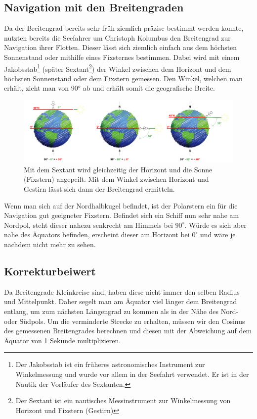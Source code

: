 \begin{refsection}
\subsection{Navigation mit den Breitengraden}  \label{BreitengradM}
Da der Breitengrad bereits sehr früh ziemlich präzise bestimmt werden konnte, nutzten bereits die Seefahrer um Christoph Kolumbus den Breitengrad zur Navigation ihrer Flotten.
Dieser lässt sich ziemlich einfach aus dem höchsten Sonnenstand oder mithilfe eines Fixsternes bestimmen. Dabei wird mit einem Jakobsstab\footnote{%
Der Jakobsstab ist ein früheres astronomisches Instrument zur Winkelmessung und wurde vor allem in der Seefahrt verwendet. Er ist in der Nautik der Vorläufer des Sextanten.} (später Sextant\footnote{%
Der Sextant ist ein nautisches Messinstrument zur Winkelmessung von Horizont und Fixstern (Gestirn)}) der Winkel zwischen dem Horizont und dem höchsten Sonnenstand oder dem Fixstern gemessen. Den Winkel, welchen man erhält, zieht man von 90° ab und erhält somit die geografische Breite. 

\begin{figure}[htbp]
\centering
\includegraphics[width=1\textwidth]{kugel/Breitengrad.jpg}
\caption{Mit dem Sextant wird gleichzeitig der Horizont und die Sonne (Fixstern) angepeilt. Mit dem Winkel zwischen Horizont und Gestirn lässt sich dann der Breitengrad ermitteln.}
\end{figure}

Wenn man sich auf der Nordhalbkugel befindet, ist der Polarstern ein für die Navigation gut geeigneter Fixstern. Befindet sich ein Schiff nun sehr nahe am Nordpol, steht dieser nahezu senkrecht am Himmels bei $90^{\circ}$. Würde es sich aber nahe des Äquators befinden, erscheint dieser am Horizont bei $0^{\circ}$ und wäre je nachdem nicht mehr zu sehen.


\subsection{Korrekturbeiwert}
Da Breitengrade Kleinkreise sind, haben diese nicht immer den selben Radius und Mittelpunkt. Daher segelt man am Äquator viel länger dem Breitengrad entlang, um zum nächsten Längengrad zu kommen als in der Nähe des Nord- oder Südpols.
Um die verminderte Strecke zu erhalten, müssen wir den Cosinus des gemessenen Breitengrades berechnen und diesen mit der Abweichung auf dem Äquator von 1 Sekunde multiplizieren.


\end{refsection}
